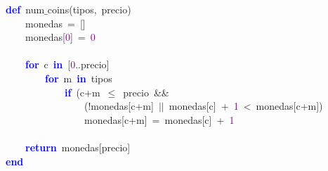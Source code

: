 \noindent
\mbox{}\textbf{\textcolor{Blue}{def}}\ num$\_$coins\textcolor{BrickRed}{(}tipos\textcolor{BrickRed}{,}\ precio\textcolor{BrickRed}{)} \\
\mbox{}\ \ \ \ monedas\ \textcolor{BrickRed}{=}\ \textcolor{BrickRed}{[]} \\
\mbox{}\ \ \ \ monedas\textcolor{BrickRed}{[}\textcolor{Purple}{0}\textcolor{BrickRed}{]}\ \textcolor{BrickRed}{=}\ \textcolor{Purple}{0} \\
\mbox{} \\
\mbox{}\ \ \ \ \textbf{\textcolor{Blue}{for}}\ c\ \textbf{\textcolor{Blue}{in}}\ \textcolor{BrickRed}{[}\textcolor{Purple}{0}\textcolor{BrickRed}{..}precio\textcolor{BrickRed}{]} \\
\mbox{}\ \ \ \ \ \ \ \ \textbf{\textcolor{Blue}{for}}\ m\ \textbf{\textcolor{Blue}{in}}\ tipos \\
\mbox{}\ \ \ \ \ \ \ \ \ \ \ \ \textbf{\textcolor{Blue}{if}}\ \textcolor{BrickRed}{(}c\textcolor{BrickRed}{+}m\ \textcolor{BrickRed}{$\le$}\ precio\ \textcolor{BrickRed}{\&\&} \\
\mbox{}\ \ \ \ \ \ \ \ \ \ \ \ \ \ \ \ \textcolor{BrickRed}{(!}monedas\textcolor{BrickRed}{[}c\textcolor{BrickRed}{+}m\textcolor{BrickRed}{]}\ \textcolor{BrickRed}{$|$$|$}\ monedas\textcolor{BrickRed}{[}c\textcolor{BrickRed}{]}\ \textcolor{BrickRed}{+}\ \textcolor{Purple}{1}\ \textcolor{BrickRed}{\textless{}}\ monedas\textcolor{BrickRed}{[}c\textcolor{BrickRed}{+}m\textcolor{BrickRed}{])} \\
\mbox{}\ \ \ \ \ \ \ \ \ \ \ \ \ \ \ \ monedas\textcolor{BrickRed}{[}c\textcolor{BrickRed}{+}m\textcolor{BrickRed}{]}\ \textcolor{BrickRed}{=}\ monedas\textcolor{BrickRed}{[}c\textcolor{BrickRed}{]}\ \textcolor{BrickRed}{+}\ \textcolor{Purple}{1} \\
\mbox{} \\
\mbox{}\ \ \ \ \textbf{\textcolor{Blue}{return}}\ monedas\textcolor{BrickRed}{[}precio\textcolor{BrickRed}{]} \\
\mbox{}\textbf{\textcolor{Blue}{end}} \\
\mbox{}
